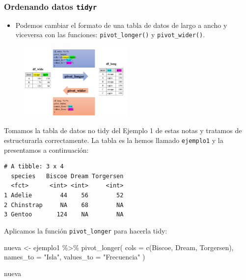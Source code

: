 \documentclass[
  letterpaper,
  DIV=11,
  numbers=noendperiod]{scrreprt}
\newenvironment{Shaded}{\begin{snugshade}}{\end{snugshade}}
\newcommand{\AttributeTok}[1]{\textcolor[rgb]{0.40,0.45,0.13}{#1}}
\newcommand{\FunctionTok}[1]{\textcolor[rgb]{0.28,0.35,0.67}{#1}}
\newcommand{\NormalTok}[1]{\textcolor[rgb]{0.00,0.23,0.31}{#1}}
\newcommand{\OtherTok}[1]{\textcolor[rgb]{0.00,0.23,0.31}{#1}}
\newcommand{\SpecialCharTok}[1]{\textcolor[rgb]{0.37,0.37,0.37}{#1}}
\newcommand{\StringTok}[1]{\textcolor[rgb]{0.13,0.47,0.30}{#1}}
\providecommand{\tightlist}{%
  \setlength{\itemsep}{0pt}\setlength{\parskip}{0pt}}\usepackage{longtable,booktabs,array}
\begin{document}
\hypertarget{ordenando-datos-tidyr}{%
\subsubsection{\texorpdfstring{Ordenando datos
\texttt{tidyr}}{Ordenando datos tidyr}}\label{ordenando-datos-tidyr}}

\begin{itemize}
\tightlist
\item
  Podemos cambiar el formato de una tabla de datos de largo a ancho y
  viceversa con las funciones: \texttt{pivot\_longer()} y
  \texttt{pivot\_wider()}.
\end{itemize}

\begin{figure}

{\centering \includegraphics[width=0.5\textwidth,height=\textheight]{Figuras/pivotting.png}

}

\end{figure}

Tomamos la tabla de datos no tidy del Ejemplo 1 de estas notas y
tratamos de estructurarla correctamente. La tabla es la hemos llamado
\texttt{ejemplo1} y la presentamos a continuación:

\begin{verbatim}
# A tibble: 3 x 4
  species   Biscoe Dream Torgersen
  <fct>      <int> <int>     <int>
1 Adelie        44    56        52
2 Chinstrap     NA    68        NA
3 Gentoo       124    NA        NA
\end{verbatim}

Aplicamos la función \texttt{pivot\_longer} para hacerla tidy:

\begin{Shaded}
\begin{Highlighting}[]
\NormalTok{nueva }\OtherTok{\textless{}{-}}\NormalTok{ ejemplo1 }\SpecialCharTok{\%\textgreater{}\%} 
  \FunctionTok{pivot\_longer}\NormalTok{(}
    \AttributeTok{cols =} \FunctionTok{c}\NormalTok{(Biscoe, Dream, Torgersen),}
    \AttributeTok{names\_to =} \StringTok{"Isla"}\NormalTok{, }\AttributeTok{values\_to =} \StringTok{"Frecuencia"}
\NormalTok{  )}

\NormalTok{nueva}
\end{Highlighting}
\end{Shaded}
\end{document}

